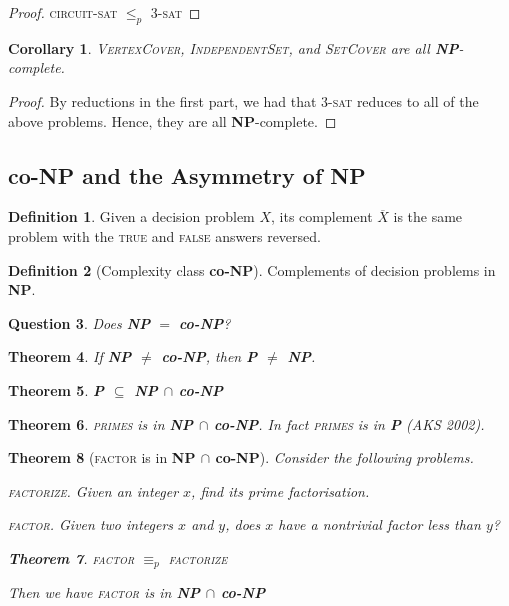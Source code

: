 \documentclass[10pt, oneside, reqno]{amsart}
\theoremstyle{plain}%
\newtheorem{thm}{Theorem}[section]
\newtheorem{question}[thm]{Question}
\newtheorem*{cor}{Corollary}
\theoremstyle{definition}
\newtheorem{defn}[thm]{Definition}
\theoremstyle{remark}
\begin{document}
\begin{proof}
    \textsc{circuit-sat} $\leq_p$ \textsc{3-sat}
\end{proof}


\begin{cor}
    \textsc{VertexCover}, \textsc{IndependentSet}, and \textsc{SetCover} are all \textbf{NP}-complete.
\end{cor}

\begin{proof}
    By reductions in the first part, we had that \textsc{3-sat} reduces to all of the above problems.  Hence, they are all \textbf{NP}-complete.
\end{proof}

\subsection{co-\textbf{NP} and the Asymmetry of \textbf{NP}} %
\label{sub:coNP}

\begin{defn}
    Given a decision problem $X$, its complement $\overline{X}$ is the same problem with the \textsc{true} and \textsc{false} answers reversed.
\end{defn}

\begin{defn}[Complexity class \textbf{co-}\textbf{NP}]
    Complements of decision problems in \textbf{NP}.
\end{defn}

\begin{question}
    Does \textbf{NP} $=$ \textbf{co-\textbf{NP}}?
\end{question}


\begin{thm}
    If \textbf{NP $\neq$ co-NP}, then \textbf{P $\neq$ NP}.
\end{thm}

\begin{thm}
    \textbf{P $\subseteq$ NP $\cap$ \textbf{co-NP}}
\end{thm}

\begin{thm}
    \textsc{primes} is in \textbf{NP $\cap$ co-NP}. In fact \textsc{primes} is in \textbf{P} (AKS 2002).
\end{thm}

\begin{thm}[\textsc{factor} is in \textbf{NP $\cap$ co-NP}]Consider the following problems.
    
    \textsc{factorize}.  Given an integer $x$, find its prime factorisation.
    
    \textsc{factor}.  Given two integers $x$ and $y$, does $x$ have a nontrivial factor less than $y$?
        
\begin{thm}
    \textsc{factor} $\equiv_p$ \textsc{factorize}
\end{thm}

Then we have \textsc{factor} is in \textbf{NP $\cap$ co-NP}
\end{thm}
\end{document}
